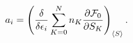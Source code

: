 \begin{equation}
a_{i}=\left( \frac{\delta }{\delta \epsilon _{i}}\sum_{K=0}^{N}n_{K}\frac{%
\partial {\cal F}_{0}}{\partial S_{K}}\right) _{\langle S\rangle }.
\end{equation}

